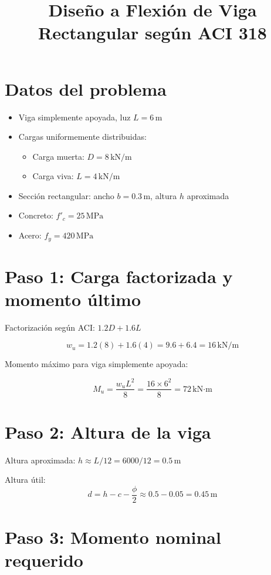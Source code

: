 \documentclass[12pt]{article}
\title{Diseño a Flexión de Viga Rectangular según ACI 318}
\author{}
\date{}
\begin{document}
\maketitle

\section*{Datos del problema}

\begin{itemize}
    \item Viga simplemente apoyada, luz $L = 6 \, \text{m}$
    \item Cargas uniformemente distribuidas:
    \begin{itemize}
        \item Carga muerta: $D = 8 \, \text{kN/m}$
        \item Carga viva: $L = 4 \, \text{kN/m}$
    \end{itemize}
    \item Sección rectangular: ancho $b = 0.3 \, \text{m}$, altura $h$ aproximada
    \item Concreto: $f'_c = 25 \, \text{MPa}$
    \item Acero: $f_y = 420 \, \text{MPa}$
\end{itemize}

\section*{Paso 1: Carga factorizada y momento último}

Factorización según ACI: $1.2D + 1.6L$

\[
w_u = 1.2(8) + 1.6(4) = 9.6 + 6.4 = 16 \, \text{kN/m}
\]

Momento máximo para viga simplemente apoyada:

\[
M_u = \frac{w_u L^2}{8} = \frac{16 \times 6^2}{8} = 72 \, \text{kN·m}
\]

\section*{Paso 2: Altura de la viga}

Altura aproximada: $h \approx L/12 = 6000/12 = 0.5 \, \text{m}$

Altura útil:
\[
d = h - c - \frac{\phi}{2} \approx 0.5 - 0.05 = 0.45 \, \text{m}
\]

\section*{Paso 3: Momento nominal requerido}
\end{document}
